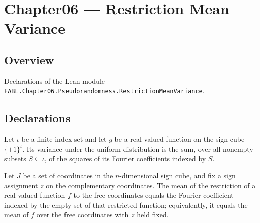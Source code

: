 \chapter{Chapter06 — Restriction Mean Variance}
\section{Overview}

Declarations of the Lean module \texttt{FABL.Chapter06.Pseudorandomness.RestrictionMeanVariance}.

\section{Declarations}

\begin{theorem}
\label{FABL.variance_eq_sum_sq_indexedFourierCoeff_ne_empty}
\leanok
{}
Let $\iota$ be a finite index set and let $g$ be a real-valued function on the sign cube
$\{\pm1\}^{\iota}$. Its variance under the uniform distribution is the sum, over all
nonempty subsets $S\subseteq\iota$, of the squares of its Fourier coefficients indexed
by $S$.
\end{theorem}

\begin{theorem}
\label{FABL.mean_signRestriction_eq_restrictionFourierCoeff_empty}
\leanok
{}
Let $J$ be a set of coordinates in the $n$-dimensional sign cube, and fix a sign
assignment $z$ on the complementary coordinates. The mean of the restriction of a
real-valued function $f$ to the free coordinates equals the Fourier coefficient indexed
by the empty set of that restricted function; equivalently, it equals the mean of $f$
over the free coordinates with $z$ held fixed.
\end{theorem}

